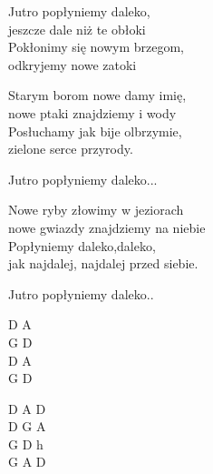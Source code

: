 \begin{text}
    \vin Jutro popłyniemy daleko,\\
    \vin jeszcze dale niż te obłoki\\
    \vin Pokłonimy się nowym brzegom,\\
    \vin odkryjemy nowe zatoki

    Starym borom nowe damy imię,\\
    nowe ptaki znajdziemy i wody\\
    Posłuchamy jak bije olbrzymie,\\
    zielone serce przyrody.

    \vin Jutro popłyniemy daleko...

    Nowe ryby złowimy w jeziorach\\
    nowe gwiazdy znajdziemy na niebie\\
    Popłyniemy daleko,daleko,\\
    jak najdalej, najdalej przed siebie.

    \vin Jutro popłyniemy daleko..
\end{text}
\begin{chord}
    D A\\
    G D\\
    D A\\
    G D

    D A D\\
    D G A\\
    G D h\\
    G A D
\end{chord}